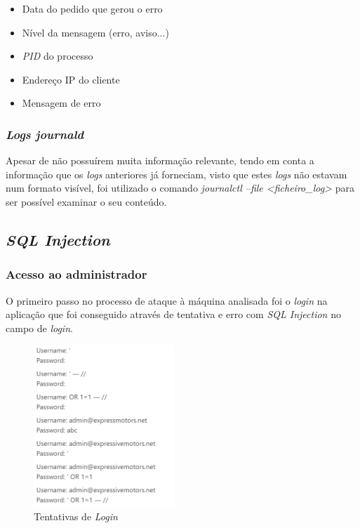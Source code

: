\documentclass[10pt,english]{article}
\begin{document}
\begin{itemize}
    \item Data do pedido que gerou o erro
    \item Nível da mensagem (erro, aviso...)
    \item \textit{PID} do processo
    \item Endereço IP do cliente
    \item Mensagem de erro
\end{itemize}

\subsubsection{\textit{Logs journald}}

\par Apesar de não possuírem muita informação relevante, tendo em conta a informação que os \textit{logs} anteriores já forneciam, visto que estes \textit{logs} não estavam num formato visível, foi utilizado o comando \textit{journalctl --file <ficheiro\_log>} para ser possível examinar o seu conteúdo.

\clearpage

\subsection{\textit{SQL Injection}}
\subsubsection{Acesso ao administrador}
\par O primeiro passo no processo de ataque à máquina analisada foi o \textit{login} na aplicação que foi conseguido através de tentativa e erro com \textit{SQL Injection} no campo de \textit{login}.

\begin{figure}[h]
    \centering
    \includegraphics[width=200]{images/TentativasLogin.png}
    \caption{Tentativas de \textit{Login}}
\end{figure}
\end{document}
